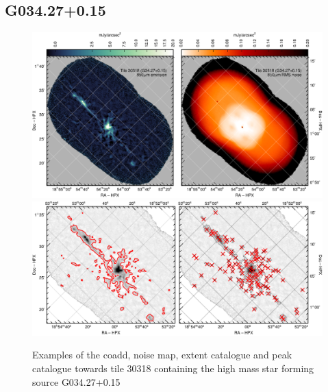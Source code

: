 \documentclass[twocolumn]{aastex6}
\begin{document}
\subsection{G034.27+0.15}
\begin{figure}
  \centering
  \includegraphics{tile30318-g34-coadd-noise.pdf}
  \\[3mm]
  \includegraphics{tile30318-g34-extent-peak.pdf}
  \caption{Examples of the coadd, noise map, extent catalogue and peak
    catalogue towards tile 30318 containing the high mass star forming
    source G034.27+0.15}
  \label{fig:g34-3}
\end{figure}
\end{document}
